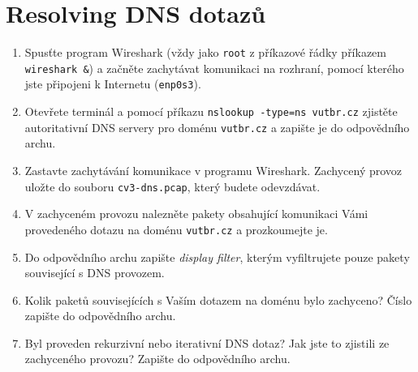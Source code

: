 \section{Resolving DNS dotazů}
\begin{enumerate}
    \item Spusťte program Wireshark (vždy jako \texttt{root} z příkazové řádky příkazem \texttt{wireshark \&}) a začněte zachytávat komunikaci na rozhraní, pomocí kterého jste připojeni k Internetu (\texttt{enp0s3}).
    \item Otevřete terminál a pomocí příkazu \texttt{nslookup -type=ns vutbr.cz} zjistěte autoritativní DNS servery pro doménu \texttt{vutbr.cz} a zapište je do odpovědního archu.
    \item Zastavte zachytávání komunikace v programu Wireshark. Zachycený provoz uložte do souboru \texttt{cv3-dns.pcap}, který budete odevzdávat.
    \item V zachyceném provozu nalezněte pakety obsahující komunikaci Vámi provedeného dotazu na doménu \texttt{vutbr.cz} a prozkoumejte je.
	\item Do odpovědního archu zapište \emph{display filter}, kterým vyfiltrujete pouze pakety související s DNS provozem.
	\item Kolik paketů souvisejících s Vaším dotazem na doménu bylo zachyceno? Číslo zapište do odpovědního archu.
	\item Byl proveden rekurzivní nebo iterativní DNS dotaz? Jak jste to zjistili ze zachyceného provozu? Zapište do odpovědního archu.
\end{enumerate}

